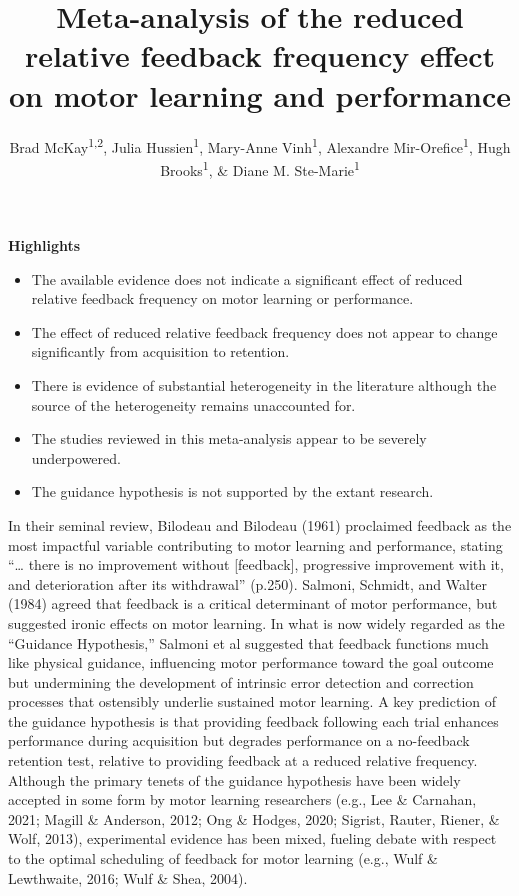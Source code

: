 \documentclass[
  english,
  man, donotrepeattitle,mask,floatsintext]{apa7}
\title{Meta-analysis of the reduced relative feedback frequency effect on motor learning and performance}
\author{Brad McKay\textsuperscript{1,2}, Julia Hussien\textsuperscript{1}, Mary-Anne Vinh\textsuperscript{1}, Alexandre Mir-Orefice\textsuperscript{1}, Hugh Brooks\textsuperscript{1}, \& Diane M. Ste-Marie\textsuperscript{1}}
\date{}
\affiliation{\vspace{0.5cm}\textsuperscript{1} School of Human Kinetics, University of Ottawa\\\textsuperscript{2} Department of Kinesiology, McMaster University}
\providecommand{\tightlist}{%
  \setlength{\itemsep}{0pt}\setlength{\parskip}{0pt}}
\begin{document}
\maketitle

\textbf{Highlights}

\begin{itemize}
\tightlist
\item
  The available evidence does not indicate a significant effect of reduced relative feedback frequency on motor learning or performance.
\item
  The effect of reduced relative feedback frequency does not appear to change significantly from acquisition to retention.
\item
  There is evidence of substantial heterogeneity in the literature although the source of the heterogeneity remains unaccounted for.
\item
  The studies reviewed in this meta-analysis appear to be severely underpowered.
\item
  The guidance hypothesis is not supported by the extant research.
\end{itemize}

\newpage

In their seminal review, Bilodeau and Bilodeau (1961) proclaimed feedback as the most impactful variable contributing to motor learning and performance, stating ``\ldots{} there is no improvement without {[}feedback{]}, progressive improvement with it, and deterioration after its withdrawal'' (p.250). Salmoni, Schmidt, and Walter (1984) agreed that feedback is a critical determinant of motor performance, but suggested ironic effects on motor learning. In what is now widely regarded as the ``Guidance Hypothesis,'' Salmoni et al suggested that feedback functions much like physical guidance, influencing motor performance toward the goal outcome but undermining the development of intrinsic error detection and correction processes that ostensibly underlie sustained motor learning. A key prediction of the guidance hypothesis is that providing feedback following each trial enhances performance during acquisition but degrades performance on a no-feedback retention test, relative to providing feedback at a reduced relative frequency. Although the primary tenets of the guidance hypothesis have been widely accepted in some form by motor learning researchers (e.g., Lee \& Carnahan, 2021; Magill \& Anderson, 2012; Ong \& Hodges, 2020; Sigrist, Rauter, Riener, \& Wolf, 2013), experimental evidence has been mixed, fueling debate with respect to the optimal scheduling of feedback for motor learning (e.g., Wulf \& Lewthwaite, 2016; Wulf \& Shea, 2004).
\end{document}
